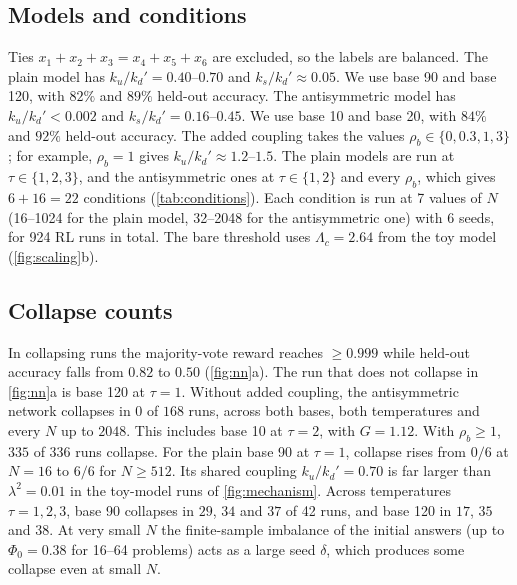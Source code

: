 \subsection{Models and conditions}
Ties $x_1+x_2+x_3=x_4+x_5+x_6$ are excluded, so the labels are balanced.
The plain model has $k_u/k_d'=0.40$--$0.70$ and $k_s/k_d'\approx0.05$. We use base 90 and base 120, with $82\%$ and $89\%$ held-out accuracy.
The antisymmetric model has $k_u/k_d'<0.002$ and $k_s/k_d'=0.16$--$0.45$. We use base 10 and base 20, with $84\%$ and $92\%$ held-out accuracy.
The added coupling takes the values $\rho_b\in\{0,0.3,1,3\}$; for example, $\rho_b=1$ gives $k_u/k_d'\approx1.2$--$1.5$.
The plain models are run at $\tau\in\{1,2,3\}$, and the antisymmetric ones at $\tau\in\{1,2\}$ and every $\rho_b$, which gives $6+16=22$ conditions (\cref{tab:conditions}).
Each condition is run at 7 values of $N$ (16--1024 for the plain model, 32--2048 for the antisymmetric one) with 6 seeds, for 924 RL runs in total.
The bare threshold uses $\Lambda_c=2.64$ from the toy model (\cref{fig:scaling}b).

\subsection{Collapse counts}
In collapsing runs the majority-vote reward reaches $\ge0.999$ while held-out accuracy falls from $0.82$ to $0.50$ (\cref{fig:nn}a). The run that does not collapse in \cref{fig:nn}a is base 120 at $\tau=1$.
Without added coupling, the antisymmetric network collapses in $0$ of $168$ runs, across both bases, both temperatures and every $N$ up to $2048$. This includes base 10 at $\tau=2$, with $G=1.12$. With $\rho_b\ge1$, $335$ of $336$ runs collapse.
For the plain base 90 at $\tau=1$, collapse rises from $0/6$ at $N=16$ to $6/6$ for $N\ge512$. Its shared coupling $k_u/k_d'=0.70$ is far larger than $\lambda^2=0.01$ in the toy-model runs of \cref{fig:mechanism}.
Across temperatures $\tau=1,2,3$, base 90 collapses in $29$, $34$ and $37$ of 42 runs, and base 120 in $17$, $35$ and $38$.
At very small $N$ the finite-sample imbalance of the initial answers (up to $\Phi_0=0.38$ for 16--64 problems) acts as a large seed $\delta$, which produces some collapse even at small $N$.

